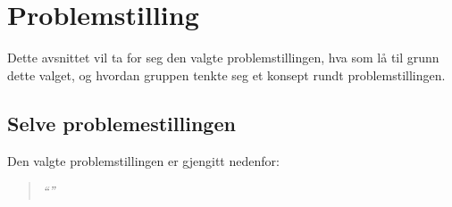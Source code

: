 \section{Problemstilling}\label{sec:problemstilling}
Dette avsnittet vil ta for seg den valgte problemstillingen, hva som lå
til grunn dette valget, og hvordan gruppen tenkte seg et konsept rundt
problemstillingen.
\subsection{Selve problemestillingen}
Den valgte problemstillingen er gjengitt nedenfor:
\begin{quotation}
\large\emph{``''}
\end{quotation}
